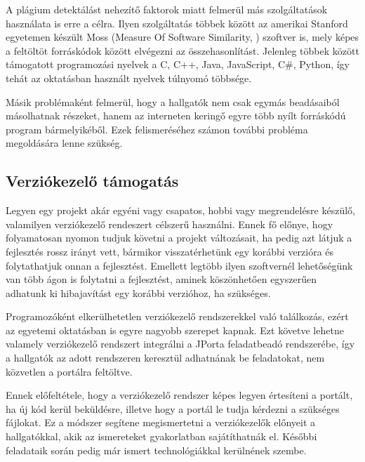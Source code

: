 A plágium detektálást nehezítő faktorok miatt felmerül más szolgáltatások használata is erre a célra. Ilyen szolgáltatás többek között az amerikai Stanford egyetemen készült Moss (Measure Of Software Similarity, \cite{Moss}) szoftver is, mely képes a feltöltöt forráskódok között elvégezni az összehasonlítást. Jelenleg többek között támogatott programozási nyelvek a C, C++, Java, JavaScript, C\#, Python, így tehát az oktatásban használt nyelvek túlnyomó többsége.

Másik problémaként felmerül, hogy a hallgatók nem csak egymás beadásaiból másolhatnak részeket, hanem az interneten keringő egyre több nyílt forráskódú program bármelyikéből. Ezek felismeréséhez számon további probléma megoldására lenne szükség.

\subsection{Verziókezelő támogatás}

Legyen egy projekt akár egyéni vagy csapatos, hobbi vagy megrendelésre készülő, valamilyen verziókezelő rendeszert célszerű használni. Ennek fő előnye, hogy folyamatosan nyomon tudjuk követni a projekt változásait, ha pedig azt látjuk a fejlesztés rossz irányt vett, bármikor visszatérhetünk egy korábbi verzióra és folytathatjuk onnan a fejlesztést. Emellett legtöbb ilyen szoftvernél lehetőségünk van több ágon is folytatni a fejlesztést, aminek köszönhetően egyszerűen adhatunk ki hibajavítást egy korábbi verzióhoz, ha szükséges.

Programozóként elkerülhetetlen verziókezelő rendszerekkel való találkozás, ezért az egyetemi oktatásban is egyre nagyobb szerepet kapnak. Ezt követve lehetne valamely verziókezelő rendszert integrálni a JPorta feladatbeadó rendszerébe, így a hallgatók az adott rendszeren keresztül adhatnának be feladatokat, nem közvetlen a portálra feltöltve.

Ennek előfeltétele, hogy a verziókezelő rendszer képes legyen értesíteni a portált, ha új kód kerül beküldésre, illetve hogy a portál le tudja kérdezni a szükséges fájlokat. Ez a módszer segítene megismertetni a verziókezelők előnyeit a hallgatókkal, akik az ismereteket gyakorlatban sajátíthatnák el. Későbbi feladataik során pedig már ismert technológiákkal kerülnének szembe.